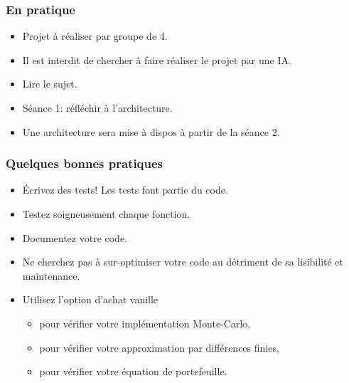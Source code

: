 \documentclass[10pt,color,leqno]{beamer}
\theoremstyle{plain}
\begin{document}
\begin{frame}
  \frametitle{En pratique}

  \begin{itemize}
    \item Projet à réaliser par groupe de 4.
    \item Il est interdit de chercher à faire réaliser le projet par une IA.
    \item Lire le sujet.
    \item Séance 1: réfléchir à l'architecture.
    \item Une architecture sera mise à dispos à partir de la séance 2.
  \end{itemize}

\end{frame}

\begin{frame}
  \frametitle{Quelques bonnes pratiques}

  \begin{itemize}
    \item Écrivez des tests! Les tests font partie du code.
    \item Testez soigneusement chaque fonction.
    \item Documentez votre code.
    \item Ne cherchez pas à sur-optimiser votre code au détriment de sa lisibilité et maintenance.
    \item Utilisez l'option d'achat vanille
    \begin{itemize}
      \item pour vérifier votre implémentation Monte-Carlo,
      \item pour vérifier votre approximation par différences finies,
      \item pour vérifier votre équation de portefeuille.
    \end{itemize} 
  \end{itemize}

  

\end{frame}
\end{document}

